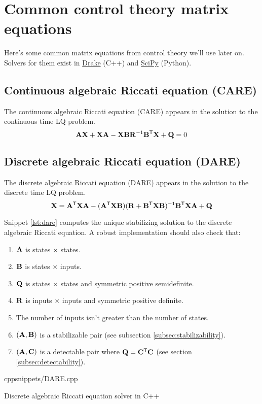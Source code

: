 \section{Common control theory matrix equations}

Here's some common matrix equations from control theory we'll use later on.
Solvers for them exist in \href{https://github.com/RobotLocomotion/drake}{Drake}
(C++) and \href{https://github.com/scipy/scipy}{SciPy} (Python).

\subsection{Continuous algebraic Riccati equation (CARE)}

The continuous algebraic Riccati equation (CARE) appears in the solution to the
continuous time LQ problem.
\begin{equation}
  \mathbf{A}\mathbf{X} + \mathbf{X}\mathbf{A} - \mathbf{X}\mathbf{B}\mathbf{R}^{-1}\mathbf{B}^\mathsf{T}\mathbf{X} +
    \mathbf{Q} = 0
\end{equation}

\subsection{Discrete algebraic Riccati equation (DARE)}

The discrete algebraic Riccati equation (DARE) appears in the solution to the
discrete time LQ problem.
\begin{equation}
  \mathbf{X} = \mathbf{A}^\mathsf{T}\mathbf{X}\mathbf{A} - (\mathbf{A}^\mathsf{T}\mathbf{X}\mathbf{B})(\mathbf{R} +
    \mathbf{B}^\mathsf{T}\mathbf{X}\mathbf{B})^{-1} \mathbf{B}^\mathsf{T}\mathbf{X}\mathbf{A} + \mathbf{Q}
\end{equation}

Snippet \ref{lst:dare} computes the unique stabilizing solution to the discrete
algebraic Riccati equation. A robust implementation should also check that:
\begin{enumerate}
  \item $\mathbf{A}$ is states $\times$ states.
  \item $\mathbf{B}$ is states $\times$ inputs.
  \item $\mathbf{Q}$ is states $\times$ states and symmetric positive semidefinite.
  \item $\mathbf{R}$ is inputs $\times$ inputs and symmetric positive definite.
  \item The number of inputs isn't greater than the number of states.
  \item $(\mathbf{A}, \mathbf{B})$ is a stabilizable pair (see subsection
    \ref{subsec:stabilizability}).
  \item $(\mathbf{A}, \mathbf{C})$ is a detectable pair where
    $\mathbf{Q} = \mathbf{C}^\mathsf{T}\mathbf{C}$ (see section \ref{subsec:detectability}).
\end{enumerate}
\begin{coderemote}{cpp}{snippets/DARE.cpp}
  \caption{Discrete algebraic Riccati equation solver in C++}
  \label{lst:dare}
\end{coderemote}

